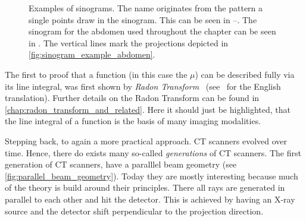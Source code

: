 \begin{figure}
	\centering
	\caption{Examples of sinograms. The name originates from the pattern a single points draw in
		the sinogram. This can be seen in
		--. The
		sinogram for the abdomen  used throughout the
		chapter can be seen in . The vertical lines
		mark the projections depicted in \autoref{fig:sinogram_example_abdomen}.
	}\label{fig:sinogram_complete}
\end{figure}

The first to proof that a function (in this case the \(\mu\)) can be described fully via its line
integral, was first shown by \textit{Radon Transform}~\cite{radon_uber_1917}
(see~\cite{radon_determination_1986} for the English translation). Further details on the Radon
Transform can be found in \autoref{chap:radon_transform_and_related}. Here it should just be
highlighted, that the line integral of a function is the basis of many imaging modalities.

Stepping back, to again a more practical approach. CT scanners evolved over time. Hence, there do
exists many so-called \textit{generations} of CT scanners. The first generation of CT scanners, have
a paralllel beam geometry (see \autoref{fig:parallel_beam_geometry}). Today they are mostly
interesting because much of the theory is build around their principles. There all rays are
generated in parallel to each other and hit the detector. This is achieved by having an X-ray source
and the detector shift perpendicular to the projection direction.

